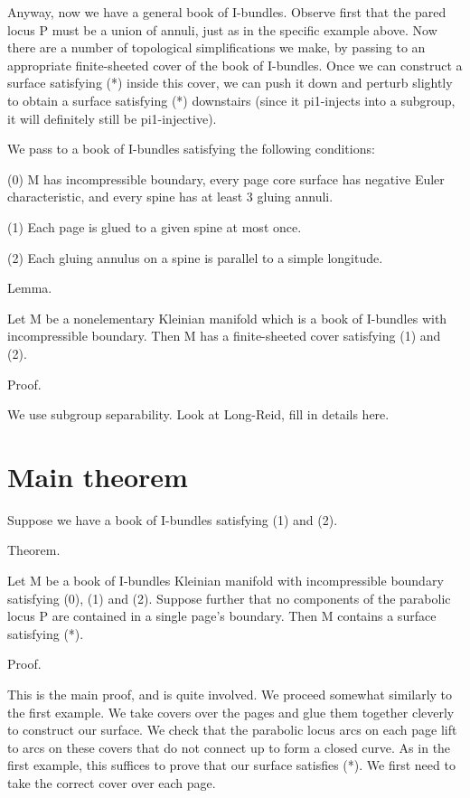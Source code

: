 \documentclass[12pt]{amsart}
\theoremstyle{definition}
\theoremstyle{remark}
\begin{document}
Anyway, now we have a general book of I-bundles. Observe first that the pared
locus P must be a union of annuli, just as in the specific example above.  Now
there are a number of topological simplifications we make, by passing to an
appropriate finite-sheeted cover of the book of I-bundles.  Once we can
construct a surface satisfying (*) inside this cover, we can push it down and
perturb slightly to obtain a surface satisfying (*) downstairs (since it
pi1-injects into a subgroup, it will definitely still be pi1-injective).

We pass to a book of I-bundles satisfying the following conditions:

(0) M has incompressible boundary, every page core surface has negative Euler
characteristic, and every spine has at least 3 gluing annuli.

(1) Each page is glued to a given spine at most once.

(2) Each gluing annulus on a spine is parallel to a simple longitude.

Lemma.

Let M be a nonelementary Kleinian manifold which is a book of I-bundles with
incompressible boundary. Then M has a finite-sheeted cover satisfying (1) and
(2).

Proof.

We use subgroup separability. Look at Long-Reid, fill in details here.

\section{Main theorem}

Suppose we have a book of I-bundles satisfying (1) and (2).

Theorem.

Let M be a book of I-bundles Kleinian manifold with incompressible boundary
satisfying (0), (1) and (2). Suppose further that no components of the
parabolic locus P are contained in a single page's boundary. Then M contains
a surface satisfying (*).

Proof.

This is the main proof, and is quite involved. We proceed somewhat similarly to
the first example. We take covers over the pages and glue them together
cleverly to construct our surface. We check that the parabolic locus arcs on
each page lift to arcs on these covers that do not connect up to form a closed
curve. As in the first example, this suffices to prove that our surface
satisfies (*). We first need to take the correct cover over each page.
\end{document}
